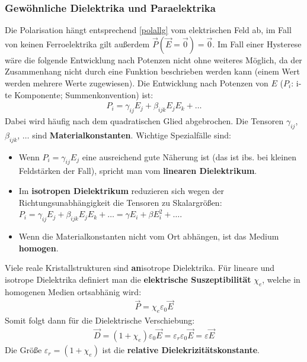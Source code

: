	  \subsubsection{Gewöhnliche Dielektrika und Paraelektrika}\label{elmaterial}
			   Die Polarisation hängt entsprechend \ref{polallg} vom elektrischen Feld ab, im Fall von keinen Ferroelektrika gilt außerdem $\vec{P}(\vec{E} = \vec{0}) = \vec{0}$. Im Fall einer Hysterese wäre die folgende Entwicklung nach Potenzen nicht ohne weiteres Möglich, da der Zusammenhang nicht durch eine Funktion beschrieben werden kann (einem Wert werden mehrere Werte zugewiesen). Die Entwicklung nach Potenzen von $E$ ($P_i$: i-te Komponente; Summenkonvention) ist:
			        \begin{equation}\begin{split}
					        P_i = \gamma_{ij} E_j + \beta_{ijk} E_j E_k + \ldots
				        \end{split}\end{equation}
			        Dabei wird häufig nach dem quadratischen Glied abgebrochen. Die Tensoren $\gamma_{ij}$, $\beta_{ijk}$, $\ldots$ sind \textbf{Materialkonstanten}. Wichtige Spezialfälle sind:
			        \begin{itemize}
			        	\item Wenn $P_i = \gamma_{ij} E_j$ eine ausreichend gute Näherung ist (das ist ibs. bei kleinen Feldstärken der Fall), spricht man vom \textbf{linearen Dielektrikum}.
			        	\item Im \textbf{isotropen Dielektrikum} reduzieren sich wegen der Richtungsunabhängigkeit die Tensoren zu Skalargrößen: $P_i = \gamma_{ij} E_j + \beta_{ijk} E_j E_k + \ldots = \gamma E_i +\beta E_i^2 +\ldots$.
			        	\item Wenn die Materialkonstanten nicht vom Ort abhängen, ist das Medium \textbf{homogen}.
			        \end{itemize}
			          Viele reale Kristallstrukturen sind \textbf{an}isotrope Dielektrika. Für lineare und isotrope Dielektrika definiert man die \textbf{elektrische Suszeptibilität} $\chi_e$, welche in homogenen Medien ortsabhänig wird:
			        \begin{equation}\label{elsus}\begin{split}
					        \vec{P} = \chi_e\varepsilon_0 \vec{E}
				        \end{split}\end{equation}
			   Somit folgt dann für die Dielektrische Verschiebung:
			        \begin{equation}\label{susversch}\begin{split}
					        \boxed{\vec{D} = (1+\chi_e)\varepsilon_0 \vec{E} = \varepsilon_r\varepsilon_0 \vec{E} = \varepsilon \vec{E}}
				        \end{split}\end{equation}
			   Die Größe $\varepsilon_r = (1+\chi_e)$ ist die \textbf{relative Dielekrizitätskonstante}.
